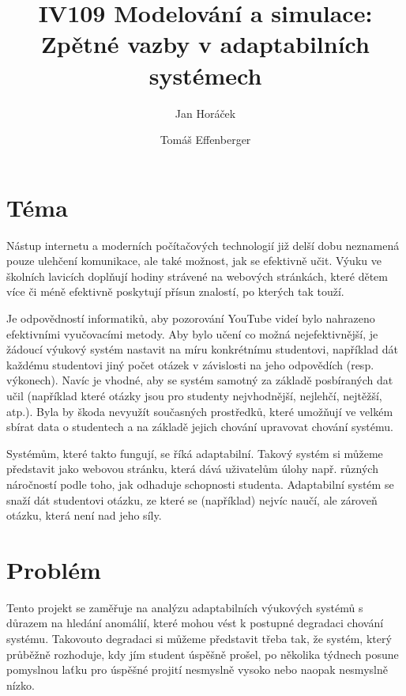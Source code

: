 \documentclass[twocolumn,10pt,cleanfoot]{asme2ej}
\title{IV109 Modelování a simulace:\\Zpětné vazby v adaptabilních systémech}
\author{
    \textmd{Jan Horáček}
    \affiliation{
    445326@mail.muni.cz
    }
    \and
    Tomáš Effenberger
    \affiliation{
    410350@mail.muni.cz
    }

}
\begin{document}
\maketitle

\section{Téma}

Nástup internetu a moderních počítačových technologií již delší dobu neznamená pouze ulehčení komunikace, ale také možnost, jak se efektivně učit. Výuku ve školních lavicích doplňují hodiny strávené na webových stránkách, které dětem více či méně efektivně poskytují přísun znalostí, po kterých tak touží.


Je odpovědností informatiků, aby pozorování YouTube videí bylo nahrazeno efektivními vyučovacími metody. Aby bylo učení co možná nejefektivnější, je žádoucí výukový systém nastavit na míru konkrétnímu studentovi, například dát každému studentovi jiný počet otázek v závislosti na jeho odpovědích (resp. výkonech). Navíc je vhodné, aby se systém samotný za základě posbíraných dat učil (například které otázky jsou pro studenty nejvhodnější, nejlehčí, nejtěžší, atp.). Byla by škoda nevyužít současných prostředků, které umožňují ve velkém sbírat data o studentech a na základě jejich chování upravovat chování systému.

Systémům, které takto fungují, se říká adaptabilní.
Takový systém si můžeme představit jako webovou stránku, která dává uživatelům úlohy např. různých náročností podle toho, jak odhaduje schopnosti studenta. Adaptabilní systém se snaží dát studentovi otázku, ze které se (například) nejvíc naučí, ale zároveň otázku, která není nad jeho síly.

\section{Problém}

Tento projekt se zaměřuje na analýzu adaptabilních výukových systémů s důrazem na hledání anomálií, které mohou vést k postupné degradaci chování systému. Takovouto degradaci si můžeme představit třeba tak, že systém, který průběžně rozhoduje, kdy jím student úspěšně prošel, po několika týdnech posune pomyslnou laťku pro úspěšné projití nesmyslně vysoko nebo naopak nesmyslně nízko.
\end{document}
